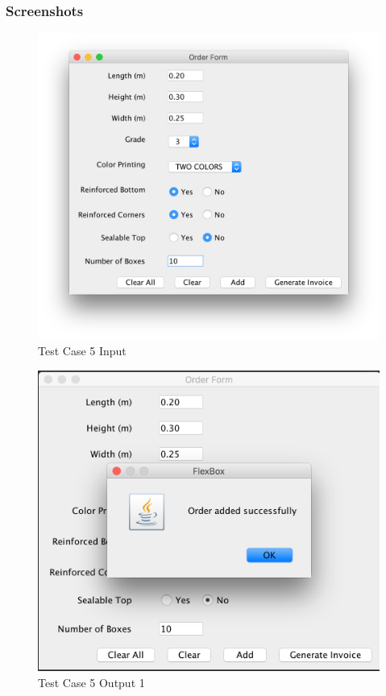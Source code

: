 \documentclass[12pt]{article}
\begin{document}
\subsubsection{Screenshots}
\begin{figure}[H]
	\includegraphics[width=\linewidth]{./screenshots/test_case_5_input.png}
	\caption{Test Case 5 Input}
	\label{test_case_5_input}
\end{figure}
\begin{figure}[H]
	\includegraphics[width=\linewidth]{./screenshots/test_case_5_output_1.png}
	\caption{Test Case 5 Output 1}
	\label{test_case_5_output}
\end{figure}
\end{document}
